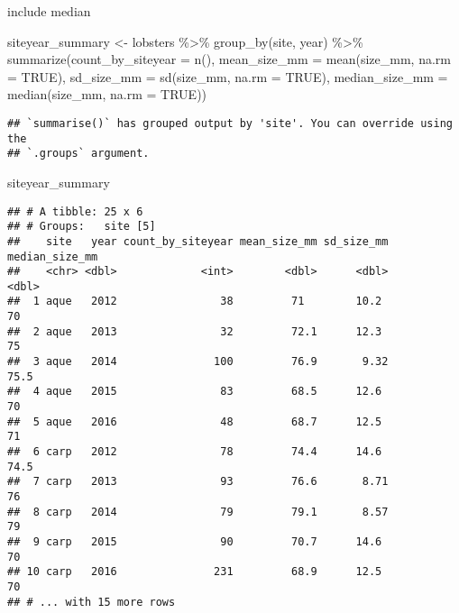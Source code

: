 \documentclass[
]{article}
\newenvironment{Shaded}{\begin{snugshade}}{\end{snugshade}}
\newcommand{\AttributeTok}[1]{\textcolor[rgb]{0.77,0.63,0.00}{#1}}
\newcommand{\ConstantTok}[1]{\textcolor[rgb]{0.00,0.00,0.00}{#1}}
\newcommand{\FunctionTok}[1]{\textcolor[rgb]{0.00,0.00,0.00}{#1}}
\newcommand{\NormalTok}[1]{#1}
\newcommand{\OtherTok}[1]{\textcolor[rgb]{0.56,0.35,0.01}{#1}}
\newcommand{\SpecialCharTok}[1]{\textcolor[rgb]{0.00,0.00,0.00}{#1}}
\begin{document}
include median

\begin{Shaded}
\begin{Highlighting}[]
\NormalTok{siteyear\_summary }\OtherTok{\textless{}{-}}\NormalTok{ lobsters }\SpecialCharTok{\%\textgreater{}\%}
  \FunctionTok{group\_by}\NormalTok{(site, year) }\SpecialCharTok{\%\textgreater{}\%}
  \FunctionTok{summarize}\NormalTok{(}\AttributeTok{count\_by\_siteyear =}  \FunctionTok{n}\NormalTok{(), }
            \AttributeTok{mean\_size\_mm =} \FunctionTok{mean}\NormalTok{(size\_mm, }\AttributeTok{na.rm =} \ConstantTok{TRUE}\NormalTok{), }
            \AttributeTok{sd\_size\_mm =} \FunctionTok{sd}\NormalTok{(size\_mm, }\AttributeTok{na.rm =} \ConstantTok{TRUE}\NormalTok{), }
            \AttributeTok{median\_size\_mm =} \FunctionTok{median}\NormalTok{(size\_mm, }\AttributeTok{na.rm =} \ConstantTok{TRUE}\NormalTok{))}
\end{Highlighting}
\end{Shaded}

\begin{verbatim}
## `summarise()` has grouped output by 'site'. You can override using the
## `.groups` argument.
\end{verbatim}

\begin{Shaded}
\begin{Highlighting}[]
\NormalTok{siteyear\_summary}
\end{Highlighting}
\end{Shaded}

\begin{verbatim}
## # A tibble: 25 x 6
## # Groups:   site [5]
##    site   year count_by_siteyear mean_size_mm sd_size_mm median_size_mm
##    <chr> <dbl>             <int>        <dbl>      <dbl>          <dbl>
##  1 aque   2012                38         71        10.2            70  
##  2 aque   2013                32         72.1      12.3            75  
##  3 aque   2014               100         76.9       9.32           75.5
##  4 aque   2015                83         68.5      12.6            70  
##  5 aque   2016                48         68.7      12.5            71  
##  6 carp   2012                78         74.4      14.6            74.5
##  7 carp   2013                93         76.6       8.71           76  
##  8 carp   2014                79         79.1       8.57           79  
##  9 carp   2015                90         70.7      14.6            70  
## 10 carp   2016               231         68.9      12.5            70  
## # ... with 15 more rows
\end{verbatim}
\end{document}
